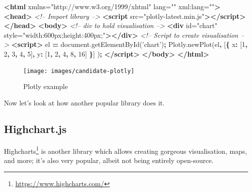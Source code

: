 \documentclass[10pt,]{krantz}
\makeatletter
\newenvironment{Shaded}{\begin{snugshade}}{\end{snugshade}}
\newcommand{\AttributeTok}[1]{\textcolor[rgb]{0.61,0.61,0.61}{#1}}
\newcommand{\CommentTok}[1]{\textcolor[rgb]{0.37,0.37,0.37}{\textit{#1}}}
\newcommand{\DataTypeTok}[1]{\textcolor[rgb]{0.27,0.27,0.27}{#1}}
\newcommand{\DecValTok}[1]{\textcolor[rgb]{0.06,0.06,0.06}{#1}}
\newcommand{\KeywordTok}[1]{\textcolor[rgb]{0.27,0.27,0.27}{\textbf{#1}}}
\newcommand{\NormalTok}[1]{#1}
\newcommand{\OperatorTok}[1]{\textcolor[rgb]{0.43,0.43,0.43}{\textbf{#1}}}
\newcommand{\OtherTok}[1]{\textcolor[rgb]{0.37,0.37,0.37}{#1}}
\newcommand{\StringTok}[1]{\textcolor[rgb]{0.5,0.5,0.5}{#1}}
\newcommand{\VariableTok}[1]{\textcolor[rgb]{0,0,0}{#1}}
\renewcommand{\href}[2]{#2\footnote{\url{#1}}}
\newenvironment{kframe}{%
\medskip{}
\setlength{\fboxsep}{.8em}
 \def\at@end@of@kframe{}%
 \ifinner\ifhmode%
  \def\at@end@of@kframe{\end{minipage}}%
  \begin{minipage}{\columnwidth}%
 \fi\fi%
 \def\FrameCommand##1{\hskip\@totalleftmargin \hskip-\fboxsep
 \colorbox{shadecolor}{##1}\hskip-\fboxsep
     \hskip-\linewidth \hskip-\@totalleftmargin \hskip\columnwidth}%
 \MakeFramed {\advance\hsize-\width
   \@totalleftmargin\z@ \linewidth\hsize
   \@setminipage}}%
 {\par\unskip\endMakeFramed%
 \at@end@of@kframe}
\renewenvironment{Shaded}{\begin{kframe}}{\end{kframe}}
\makeatother
\begin{document}
\begin{Shaded}
\begin{Highlighting}[]
\KeywordTok{<html}\OtherTok{ xmlns=}\StringTok{"http://www.w3.org/1999/xhtml"}\OtherTok{ lang=}\StringTok{""}\OtherTok{ xml:lang=}\StringTok{""}\KeywordTok{>}
\KeywordTok{<head>}
  \CommentTok{<!-- Import library -->}
  \KeywordTok{<script}\OtherTok{ src=}\StringTok{"plotly-latest.min.js"}\KeywordTok{></script>}
\KeywordTok{</head>}
\KeywordTok{<body>}
  \CommentTok{<!-- div to hold visualisation -->}
  \KeywordTok{<div}\OtherTok{ id=}\StringTok{"chart"}\OtherTok{ style=}\StringTok{"width:600px;height:400px;"}\KeywordTok{></div>}
  \CommentTok{<!-- Script to create visualisation -->}
  \KeywordTok{<script>}
\NormalTok{    el }\OperatorTok{=} \VariableTok{document}\NormalTok{.}\AttributeTok{getElementById}\NormalTok{(}\StringTok{'chart'}\NormalTok{)}\OperatorTok{;}
    \VariableTok{Plotly}\NormalTok{.}\AttributeTok{newPlot}\NormalTok{(el}\OperatorTok{,}\NormalTok{ [}\OperatorTok{\{}
      \DataTypeTok{x}\OperatorTok{:}\NormalTok{ [}\DecValTok{1}\OperatorTok{,} \DecValTok{2}\OperatorTok{,} \DecValTok{3}\OperatorTok{,} \DecValTok{4}\OperatorTok{,} \DecValTok{5}\NormalTok{]}\OperatorTok{,}
      \DataTypeTok{y}\OperatorTok{:}\NormalTok{ [}\DecValTok{1}\OperatorTok{,} \DecValTok{2}\OperatorTok{,} \DecValTok{4}\OperatorTok{,} \DecValTok{8}\OperatorTok{,} \DecValTok{16}\NormalTok{] }\OperatorTok{\}}\NormalTok{]}
\NormalTok{    )}\OperatorTok{;}
  \KeywordTok{</script>}
\KeywordTok{</body>}
\KeywordTok{</html>}
\end{Highlighting}
\end{Shaded}

\begin{figure}[H]

{\centering \texttt{[image: images/candidate-plotly]} 

}

\caption{Plotly example}\label{fig:candidate-plotly}
\end{figure}

Now let's look at how another popular library does it.

\hypertarget{widgets-basics-candidates-highcharts}{%
\subsection{Highchart.js}\label{widgets-basics-candidates-highcharts}}

\href{https://www.highcharts.com/}{Highcharts} is another library which allows creating gorgeous visualisation, maps, and more; it's also very popular, albeit not being entirely open-source.
\end{document}
